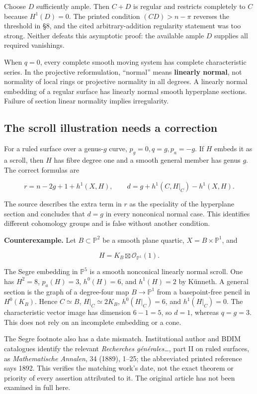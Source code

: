 Choose \(D\) sufficiently ample. Then \(C+D\) is regular and restricts completely to \(C\) because \(H^1(D)=0\). The printed condition \((CD)>n-\pi\) reverses the threshold in §8, and the cited arbitrary-addition regularity statement was too strong. Neither defeats this asymptotic proof: the available ample \(D\) supplies all required vanishings.

When \(q=0\), every complete smooth moving system has complete characteristic series. In the projective reformulation, ``normal'' means \textbf{linearly normal}, not normality of local rings or projective normality in all degrees. A linearly normal embedding of a regular surface has linearly normal smooth hyperplane sections. Failure of section linear normality implies irregularity.

\subsection{The scroll illustration needs a correction}

For a ruled surface over a genus-\(g\) curve, \(p_g=0,q=g,p_a=-g\). If \(H\) embeds it as a scroll, then \(H\) has fibre degree one and a smooth general member has genus \(g\). The correct formulas are

\[
r=n-2g+1+h^1(X,H),\qquad
d=g+h^1(C,H|_C)-h^1(X,H).
\tag{IV.12.2}
\]

The source describes the extra term in \(r\) as the speciality of the hyperplane section and concludes that \(d=g\) in every nonconical normal case. This identifies different cohomology groups and is false without another condition.

\textbf{Counterexample.} Let \(B\subset\mathbb P^2\) be a smooth plane quartic, \(X=B\times\mathbb P^1\), and

\[
H=K_B\boxtimes\mathcal O_{\mathbb P^1}(1).
\]

The Segre embedding in \(\mathbb P^5\) is a smooth nonconical linearly normal scroll. One has \(H^2=8\), \(p_a(H)=3\), \(h^0(H)=6\), and \(h^1(H)=2\) by Künneth. A general section is the graph of a degree-four map \(B\to\mathbb P^1\) from a basepoint-free pencil in \(H^0(K_B)\). Hence \(C\simeq B\), \(H|_C\simeq2K_B\), \(h^0(H|_C)=6\), and \(h^1(H|_C)=0\). The characteristic vector image has dimension \(6-1=5\), so \(d=1\), whereas \(q=g=3\). This does not rely on an incomplete embedding or a cone.

The Segre footnote also has a date mismatch. Institutional author and BDIM catalogues identify the relevant \emph{Recherches générales\ldots{}}, part II on ruled surfaces, as \emph{Mathematische Annalen}, 34 (1889), 1--25; the abbreviated printed reference says 1892. This verifies the matching work's date, not the exact theorem or priority of every assertion attributed to it. The original article has not been examined in full here.

